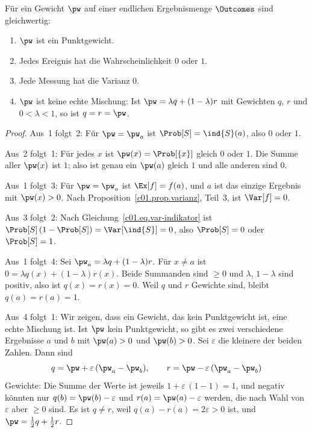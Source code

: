 \begin{proposition}\label{c01.prop.punktgewicht}
  Für ein Gewicht $\pw$ auf einer endlichen Ergebnismenge $\Outcomes$ sind gleichwertig:
  \begin{enumerate}
    \item $\pw$ ist ein Punktgewicht.
    \item Jedes Ereignis hat die Wahrscheinlichkeit $0$ oder $1$.
    \item Jede Messung hat die Varianz $0$.
    \item $\pw$ ist keine echte Mischung: Ist $\pw = \lambda q + (1 - \lambda) r$ mit
      Gewichten $q$, $r$ und $0 < \lambda < 1$, so ist $q = r = \pw$.
  \end{enumerate}
\end{proposition}
\begin{proof}
  Aus~1 folgt~2: Für $\pw = \pw_a$ ist $\Prob[S] = \ind{S}(a)$, also $0$ oder $1$.

  Aus~2 folgt~1: Für jedes $x$ ist $\pw(x) = \Prob[\{x\}]$ gleich $0$ oder $1$. Die Summe
  aller $\pw(x)$ ist $1$; also ist genau ein $\pw(a)$ gleich $1$ und alle anderen sind $0$.

  Aus~1 folgt~3: Für $\pw = \pw_a$ ist $\Ex[f] = f(a)$, und $a$ ist das einzige Ergebnis
  mit $\pw(x) > 0$. Nach Proposition~\ref{c01.prop.varianz}, Teil~3, ist $\Var[f] = 0$.

  Aus~3 folgt~2: Nach Gleichung~\eqref{c01.eq.var-indikator} ist
  $\Prob[S]\,(1 - \Prob[S]) = \Var[\ind{S}] = 0$, also $\Prob[S] = 0$ oder $\Prob[S] = 1$.

  Aus~1 folgt~4: Sei $\pw_a = \lambda q + (1 - \lambda) r$. Für $x \neq a$ ist
  $0 = \lambda q(x) + (1 - \lambda) r(x)$. Beide Summanden sind $\geq 0$ und
  $\lambda$, $1 - \lambda$ sind positiv, also ist $q(x) = r(x) = 0$. Weil $q$ und $r$
  Gewichte sind, bleibt $q(a) = r(a) = 1$.

  Aus~4 folgt~1: Wir zeigen, dass ein Gewicht, das kein Punktgewicht ist, eine echte
  Mischung ist. Ist $\pw$ kein Punktgewicht, so gibt es zwei verschiedene Ergebnisse $a$
  und $b$ mit $\pw(a) > 0$ und $\pw(b) > 0$. Sei $\varepsilon$ die kleinere der beiden
  Zahlen. Dann sind
  \begin{equation}\label{c01.eq.echte-mischung}
    q = \pw + \varepsilon\,(\pw_a - \pw_b),
    \qquad
    r = \pw - \varepsilon\,(\pw_a - \pw_b)
  \end{equation}
  Gewichte: Die Summe der Werte ist jeweils $1 + \varepsilon\,(1 - 1) = 1$, und negativ
  könnten nur $q(b) = \pw(b) - \varepsilon$ und $r(a) = \pw(a) - \varepsilon$ werden, die
  nach Wahl von $\varepsilon$ aber $\geq 0$ sind. Es ist $q \neq r$, weil
  $q(a) - r(a) = 2\varepsilon > 0$ ist, und $\pw = \tfrac12 q + \tfrac12 r$.
\end{proof}


